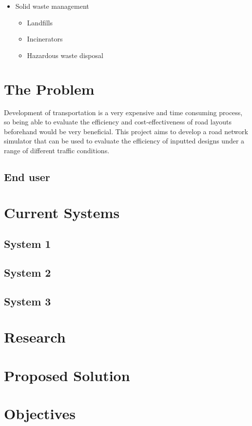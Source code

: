 \begin{itemize}
        \item Solid waste management
        \begin{itemize}
            \item Landfills
            \item Incinerators
            \item Hazardous waste disposal
        \end{itemize}
    \end{itemize}

\section{The Problem}

    Development of transportation is a very expensive and time consuming process, so being able to evaluate the efficiency and cost-effectiveness of road layouts beforehand would be very beneficial. This project aims to develop a road network simulator that can be used to evaluate the efficiency of inputted designs under a range of different traffic conditions.

    \subsection{End user}

\section{Current Systems}

    \subsection{System 1}

    \subsection{System 2}

    \subsection{System 3}

\section{Research}

\section{Proposed Solution}

\section{Objectives}
